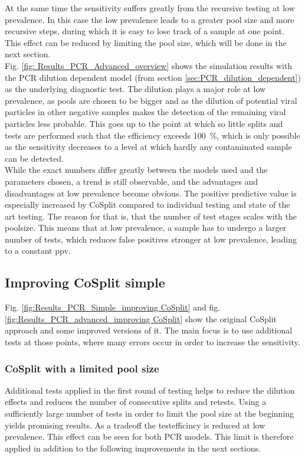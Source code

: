 \documentclass[fleqn,10pt]{wlscirep}
\begin{document}
	At the same time the sensitivity suffers greatly from the recursive testing at low prevalence. In this case the low prevalence leads to a greater pool size and more recursive steps, during which it is easy to lose track of a sample at one point. This effect can be reduced by limiting the pool size, which will be done in the next section. \\
	
	Fig. \ref{fig: Results_PCR_Advanced_overview} shows the simulation results with the PCR dilution dependent model (from section \ref{sec:PCR_dilution_dependent}) as the underlying diagnostic test. The dilution plays a major role at low prevalence, as pools are chosen to be bigger and as the dilution of potential viral particles in other negative samples makes the detection of the remaining viral particles less probable. This goes up to the point at which so little splits and tests are performed such that the efficiency exceeds \SI{100}{\percent}, which is only possible as the sensitivity decreases to a level at which hardly any contaminated sample can be detected.\\
	
	While the exact numbers differ greatly between the models used and the parameters chosen, a trend is still observable, and the advantages and disadvantages at low prevalence become obvious. The positive predictive value is especially increased by CoSplit compared to individual testing and state of the art testing. The reason for that is, that the number of test stages scales with the poolsize. This means that at low prevalence, a sample has to undergo a larger number of tests, which reduces false positives stronger at low prevalence, leading to a constant \gls{ppv}.
	
	
	\subsection{Improving CoSplit simple}
	Fig. \ref{fig:Results_PCR_Simple_improving CoSplit} and fig. \ref{fig:Results_PCR_advanced_improving CoSplit} show the original CoSplit approach and some improved versions of it. The main focus is to use additional tests at those points, where many errors occur in order to increase the sensitivity.
	
	\subsubsection{CoSplit with a limited pool size}
	Additional tests applied in the first round of testing helps to reduce the dilution effects and reduces the number of consecutive splits and retests. Using a sufficiently large number of tests in order to limit the pool size at the beginning yields promising results. As a tradeoff the testefficincy is reduced at low prevalence. This effect can be seen for both PCR models. This limit is therefore applied in addition to the following improvements in the next sections.
	
\end{document}
